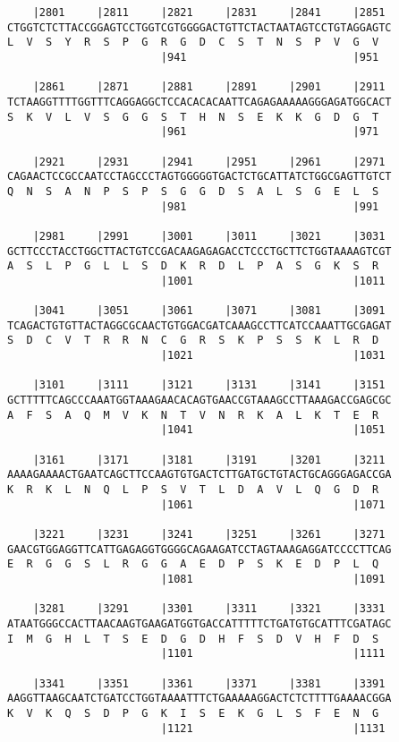 \documentclass{article}
\begin{document}
\begin{Verbatim}
    |2801     |2811     |2821     |2831     |2841     |2851 
CTGGTCTCTTACCGGAGTCCTGGTCGTGGGGACTGTTCTACTAATAGTCCTGTAGGAGTC
L  V  S  Y  R  S  P  G  R  G  D  C  S  T  N  S  P  V  G  V  
                        |941                          |951  
  
    |2861     |2871     |2881     |2891     |2901     |2911 
TCTAAGGTTTTGGTTTCAGGAGGCTCCACACACAATTCAGAGAAAAAGGGAGATGGCACT
S  K  V  L  V  S  G  G  S  T  H  N  S  E  K  K  G  D  G  T  
                        |961                          |971  
  
    |2921     |2931     |2941     |2951     |2961     |2971 
CAGAACTCCGCCAATCCTAGCCCTAGTGGGGGTGACTCTGCATTATCTGGCGAGTTGTCT
Q  N  S  A  N  P  S  P  S  G  G  D  S  A  L  S  G  E  L  S  
                        |981                          |991  
  
    |2981     |2991     |3001     |3011     |3021     |3031 
GCTTCCCTACCTGGCTTACTGTCCGACAAGAGAGACCTCCCTGCTTCTGGTAAAAGTCGT
A  S  L  P  G  L  L  S  D  K  R  D  L  P  A  S  G  K  S  R  
                        |1001                         |1011 
  
    |3041     |3051     |3061     |3071     |3081     |3091 
TCAGACTGTGTTACTAGGCGCAACTGTGGACGATCAAAGCCTTCATCCAAATTGCGAGAT
S  D  C  V  T  R  R  N  C  G  R  S  K  P  S  S  K  L  R  D  
                        |1021                         |1031 
  
    |3101     |3111     |3121     |3131     |3141     |3151 
GCTTTTTCAGCCCAAATGGTAAAGAACACAGTGAACCGTAAAGCCTTAAAGACCGAGCGC
A  F  S  A  Q  M  V  K  N  T  V  N  R  K  A  L  K  T  E  R  
                        |1041                         |1051 
  
    |3161     |3171     |3181     |3191     |3201     |3211 
AAAAGAAAACTGAATCAGCTTCCAAGTGTGACTCTTGATGCTGTACTGCAGGGAGACCGA
K  R  K  L  N  Q  L  P  S  V  T  L  D  A  V  L  Q  G  D  R  
                        |1061                         |1071 
  
    |3221     |3231     |3241     |3251     |3261     |3271 
GAACGTGGAGGTTCATTGAGAGGTGGGGCAGAAGATCCTAGTAAAGAGGATCCCCTTCAG
E  R  G  G  S  L  R  G  G  A  E  D  P  S  K  E  D  P  L  Q  
                        |1081                         |1091 
  
    |3281     |3291     |3301     |3311     |3321     |3331 
ATAATGGGCCACTTAACAAGTGAAGATGGTGACCATTTTTCTGATGTGCATTTCGATAGC
I  M  G  H  L  T  S  E  D  G  D  H  F  S  D  V  H  F  D  S  
                        |1101                         |1111 
  
    |3341     |3351     |3361     |3371     |3381     |3391 
AAGGTTAAGCAATCTGATCCTGGTAAAATTTCTGAAAAAGGACTCTCTTTTGAAAACGGA
K  V  K  Q  S  D  P  G  K  I  S  E  K  G  L  S  F  E  N  G  
                        |1121                         |1131 
  

\end{Verbatim}
\end{document}
